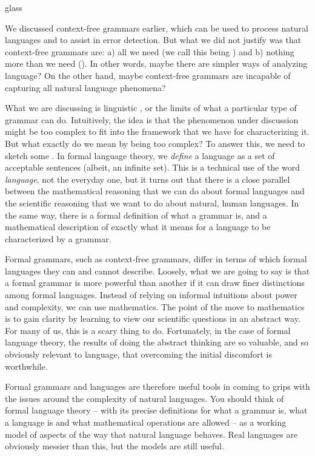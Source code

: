 \begin{tblsfilledsymbol}{}{glass}
\label{sec:complexity-of-languages}
\begin{underthehood}

    
We discussed context-free grammars earlier, which can be used to
process natural languages and to assist in error detection.  But what
we did not justify was that context-free grammars are: a) all we need
(we call this being ) and b) nothing more than we
need ().  In other words, maybe there are simpler ways
of analyzing language?  On the other hand, maybe context-free grammars
are incapable of capturing all natural language phenomena?

What we are discussing is linguistic , or the
limits of what a particular type of grammar can do.  Intuitively, the
idea is that the phenomenon under discussion might be too complex to
fit into the framework that we have for characterizing it.  But what
exactly do we mean by being too complex?  To answer this, we need to
sketch some .  In formal language
theory, we \emph{define} a language as a set of acceptable sentences
(albeit, an infinite set). This is a technical use of the word
\emph{language}, not the everyday one, but it turns out that there is
a close parallel between the mathematical reasoning that we can do
about formal languages and the scientific reasoning that we want to do
about natural, human languages.  In the same way, there is a formal
definition of what a grammar is, and a mathematical description of
exactly what it means for a language to be characterized by a grammar.

Formal grammars, such as context-free grammars, differ in terms of
which formal languages they can and cannot describe.  Loosely, what we
are going to say is that a formal grammar is more powerful than
another if it can draw finer distinctions among formal
languages. Instead of relying on informal intuitions about power and
complexity, we can use mathematics.  The point of the move to
mathematics is to gain clarity by learning to view our scientific
questions in an abstract way.  For many of us, this is a scary thing
to do.  Fortunately, in the case of formal language theory, the
results of doing the abstract thinking are so valuable, and so
obviously relevant to language, that overcoming the initial discomfort
is worthwhile.

Formal grammars and languages are therefore useful tools in coming to
grips with the issues around the complexity of natural languages.  You
should think of formal language theory -- with its precise definitions
for what a grammar is, what a language is and what mathematical
operations are allowed -- as a working model of aspects of the way
that natural language behaves.  Real languages are obviously messier
than this, but the models are still useful.


\end{underthehood}
\end{tblsfilledsymbol}
